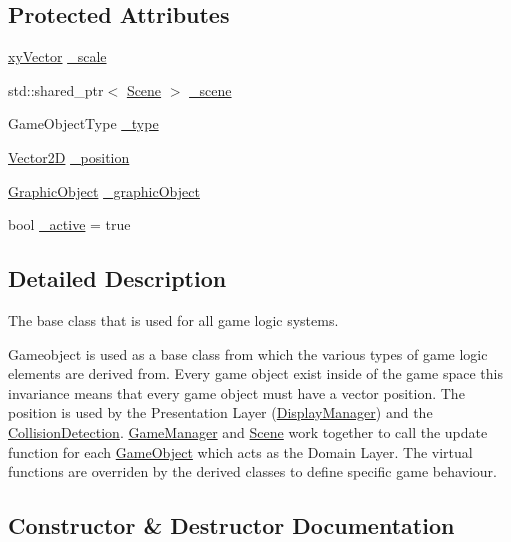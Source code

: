 \subsection*{Protected Attributes}
\begin{DoxyCompactItemize}
\item 
\hyperlink{structxy_vector}{xy\+Vector} \hyperlink{class_game_object_a9b76f90eef67b329538d15b4eeed67a1}{\+\_\+scale}
\item 
std\+::shared\+\_\+ptr$<$ \hyperlink{class_scene}{Scene} $>$ \hyperlink{class_game_object_ab8cae1a41ad1443d085c397b5e6d5609}{\+\_\+scene}
\item 
Game\+Object\+Type \hyperlink{class_game_object_aebfec45400aff20c8eab3fbf00be0aea}{\+\_\+type}
\item 
\hyperlink{class_vector2_d}{Vector2D} \hyperlink{class_game_object_af86156ef21da475d68de98761cf75512}{\+\_\+position}
\item 
\hyperlink{class_graphic_object}{Graphic\+Object} \hyperlink{class_game_object_a07c043ba60b622f256ed18dfb46c0410}{\+\_\+graphic\+Object}
\item 
bool \hyperlink{class_game_object_aef11019578aad93f96240b79a1141a07}{\+\_\+active} = true
\end{DoxyCompactItemize}


\subsection{Detailed Description}
The base class that is used for all game logic systems. 

Gameobject is used as a base class from which the various types of game logic elements are derived from. Every game object exist inside of the game space this invariance means that every game object must have a vector position. The position is used by the Presentation Layer (\hyperlink{class_display_manager}{Display\+Manager}) and the \hyperlink{class_collision_detection}{Collision\+Detection}. \hyperlink{class_game_manager}{Game\+Manager} and \hyperlink{class_scene}{Scene} work together to call the update function for each \hyperlink{class_game_object}{Game\+Object} which acts as the Domain Layer. The virtual functions are overriden by the derived classes to define specific game behaviour. 

\subsection{Constructor \& Destructor Documentation}
\mbox{\label{class_game_object_a780db39d3dc5b54c4dffe2f429f9b656}} 
